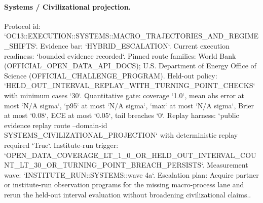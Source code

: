 \paragraph{Systems / Civilizational projection.}
Protocol id: `OC13::EXECUTION::SYSTEMS::MACRO\_TRAJECTORIES\_AND\_REGIME\_SHIFTS`. Evidence bar: `HYBRID\_ESCALATION`. Current execution readiness: `bounded evidence recorded`.
Pinned route families: World Bank (OFFICIAL\_OPEN\_DATA\_API\_DOCS); U.S. Department of Energy Office of Science (OFFICIAL\_CHALLENGE\_PROGRAM).
Held-out policy: `HELD\_OUT\_INTERVAL\_REPLAY\_WITH\_TURNING\_POINT\_CHECKS` with minimum cases `30`.
Quantitative gate: coverage `1.0`, mean abs error at most `N/A sigma`, `p95` at most `N/A sigma`, `max` at most `N/A sigma`, Brier at most `0.08`, ECE at most `0.05`, tail breaches `0`.
Replay harness: `public evidence replay route --domain-id SYSTEMS\_CIVILIZATIONAL\_PROJECTION` with deterministic replay required `True`.
Institute-run trigger: `OPEN\_DATA\_COVERAGE\_LT\_1\_0\_OR\_HELD\_OUT\_INTERVAL\_COUNT\_LT\_30\_OR\_TURNING\_POINT\_BREACH\_PERSISTS`. Measurement wave: `INSTITUTE\_RUN::SYSTEMS::wave 4a`.
Escalation plan: Acquire partner or institute-run observation programs for the missing macro-process lane and rerun the held-out interval evaluation without broadening civilizational claims..
